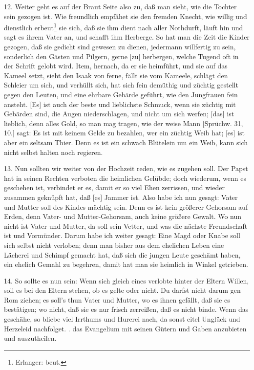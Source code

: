 12. Weiter geht es auf der Braut Seite also zu, daß man sieht, wie die Tochter sein gezogen ist. Wie freundlich empfähet sie den fremden Knecht, wie willig und dienstlich erbeut\footnote{Erlanger: beut.} sie sich, daß sie ihm dient nach aller Nothdurft, läuft hin und sagt es ihrem Vater an, und schafft ihm Herberge. So hat man die Zeit die Kinder gezogen, daß sie gedicht sind gewesen zu dienen, jedermann willfertig zu sein, sonderlich den Gästen und Pilgern, gerne [zu] herbergen, welche Tugend oft in der Schrift gelobt wird. Item, hernach, da er sie heimführt, und sie auf das Kameel setzt, sieht den Isaak von ferne, fällt sie vom Kameele, schlägt den Schleier um sich, und verhüllt sich, hat sich fein demüthig und züchtig gestellt gegen den Leuten, und eine ehrbare Gebärde geführt, wie den Jungfrauen fein ansteht. [Es] ist auch der beste und lieblichste Schmuck, wenn sie züchtig mit Gebärden sind, die Augen niederschlagen, und nicht um sich werfen; [das] ist lieblich, denn alles Gold, so man mag tragen, wie der weise Mann [Sprüchw. 31, 10.] sagt: Es ist mit keinem Gelde zu bezahlen, wer ein züchtig Weib hat; [es] ist aber ein seltsam Thier. Denn es ist ein schwach Blütelein um ein Weib, kann sich nicht selbst halten noch regieren.

13. Nun sollten wir weiter von der Hochzeit reden, wie es zugehen soll. Der Papst hat in seinen Rechten verboten die heimlichen Gelübde; doch wiederum, wenn es geschehen ist, verbindet er es, damit er so viel Ehen zerrissen, und wieder zusammen geknüpft hat, daß [es] Jammer ist. Also habe ich nun gesagt: Vater und Mutter soll des Kindes mächtig sein. Denn es ist kein größerer Gehorsam auf Erden, denn Vater- und Mutter-Gehorsam, auch keine größere Gewalt. Wo nun nicht ist Vater und Mutter, da soll sein Vetter, und was die nächste Freundschaft ist und Vormünder. Darum habe ich weiter gesagt: Eine Magd oder Knabe soll sich selbst nicht verloben; denn man bisher aus dem ehelichen Leben eine Lächerei und Schimpf gemacht hat, daß sich die jungen Leute geschämt haben, ein ehelich Gemahl zu begehren, damit hat man sie heimlich in Winkel getrieben.

14. So sollte es nun sein: Wenn sich gleich eines verlobte hinter der Eltern Willen, soll es bei den Eltern stehen, ob es gelte oder nicht. Du darfst nicht darum gen Rom ziehen; es soll's thun Vater und Mutter, wo es ihnen gefällt, daß sie es bestätigen; wo nicht, daß sie es nur frisch zerreißen, daß es nicht binde. Wenn das geschähe, so bliebe viel Irrthums und Hurerei nach, da sonst eitel Unglück und Herzeleid nachfolget.
. das Evangelium mit seinen Gütern und Gaben anzubieten und auszutheilen.

